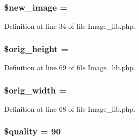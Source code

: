 \subsubsection[{\texorpdfstring{\$new\+\_\+image}{$new_image}}]{\setlength{\rightskip}{0pt plus 5cm}\$new\+\_\+image = \textquotesingle{}\textquotesingle{}}\hypertarget{class_c_i___image__lib_a6147ac30032312f2b42a9b05618faf12}{}\label{class_c_i___image__lib_a6147ac30032312f2b42a9b05618faf12}


Definition at line 34 of file Image\+\_\+lib.\+php.

\subsubsection[{\texorpdfstring{\$orig\+\_\+height}{$orig_height}}]{\setlength{\rightskip}{0pt plus 5cm}\$orig\+\_\+height = \textquotesingle{}\textquotesingle{}}\hypertarget{class_c_i___image__lib_a68713f45d7d236dfdd6aafdc9668a44d}{}\label{class_c_i___image__lib_a68713f45d7d236dfdd6aafdc9668a44d}


Definition at line 69 of file Image\+\_\+lib.\+php.

\subsubsection[{\texorpdfstring{\$orig\+\_\+width}{$orig_width}}]{\setlength{\rightskip}{0pt plus 5cm}\$orig\+\_\+width = \textquotesingle{}\textquotesingle{}}\hypertarget{class_c_i___image__lib_a336a3be3539aaae0ad42aaf4c544bb41}{}\label{class_c_i___image__lib_a336a3be3539aaae0ad42aaf4c544bb41}


Definition at line 68 of file Image\+\_\+lib.\+php.

\subsubsection[{\texorpdfstring{\$quality}{$quality}}]{\setlength{\rightskip}{0pt plus 5cm}\$quality = \textquotesingle{}90\textquotesingle{}}\hypertarget{class_c_i___image__lib_a0e342ea32cccdc2c932ad23b9796a62a}{}\label{class_c_i___image__lib_a0e342ea32cccdc2c932ad23b9796a62a}


